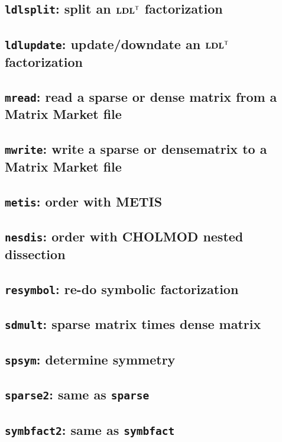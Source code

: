 \documentclass[11pt]{article}
\newcommand{\m}[1]{{\bf{#1}}}       %
\newcommand{\tr}{^{\sf T}}          %
\begin{document}
\subsection{{\tt ldlsplit}: split an $\m{LDL}\tr$ factorization}		
\newpage
\subsection{{\tt ldlupdate}: update/downdate an $\m{LDL}\tr$ factorization}	
\newpage
\subsection{{\tt mread}: read a sparse or dense matrix from a Matrix Market file}
\subsection{{\tt mwrite}: write a sparse or densematrix to a Matrix Market file}	
\newpage
\subsection{{\tt metis}: order with METIS}					
\newpage
\subsection{{\tt nesdis}: order with CHOLMOD nested dissection}			
\newpage
\subsection{{\tt resymbol}: re-do symbolic factorization}			
\subsection{{\tt sdmult}: sparse matrix times dense matrix}			
\newpage
\subsection{{\tt spsym}: determine symmetry}				
\newpage
\subsection{{\tt sparse2}: same as {\tt sparse}}				
\newpage
\subsection{{\tt symbfact2}: same as {\tt symbfact}}				
\end{document}
